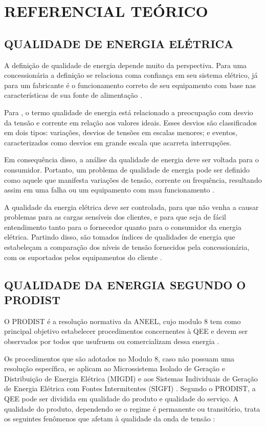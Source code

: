 \chapter{REFERENCIAL TEÓRICO}

\section{QUALIDADE DE ENERGIA ELÉTRICA}

A definição de qualidade de energia depende muito da perspectiva. Para uma concessionária a definição se relaciona coma confiança em seu sistema elétrico, já para um fabricante é o funcionamento correto de seu equipamento com base nas características de sua fonte de alimentação \cite{ref:dugan_2004}.

Para , o termo qualidade de energia está relacionado a preocupação com desvio da tensão e corrente em relação aos valores ideais. Esses desvios são classificados em dois tipos: variações, desvios de tensões em escalas menores; e eventos, caracterizados como desvios em grande escala que acarreta interrupções.

Em consequência disso, a análise da qualidade de energia deve ser voltada para o consumidor. Portanto, um problema de qualidade de energia pode ser definido como aquele que manifesta variações de tensão, corrente ou frequência, resultando assim em uma falha ou um equipamento com mau funcionamento \cite{ref:dugan_2004}.

A qualidade da energia elétrica deve ser controlada, para que não venha a causar problemas para as cargas sensíveis dos clientes, e para que seja de fácil entendimento tanto para o fornecedor quanto para o consumidor da energia elétrica. Partindo disso, são tomados índices de qualidades de energia que estabeleçam a comparação dos níveis de tensão fornecidos pela concessionária, com os suportados pelos equipamentos do cliente \cite{ref:dugan_2004}.

\section{QUALIDADE DA ENERGIA SEGUNDO O PRODIST}

O PRODIST é a resolução normativa da ANEEL, cujo modulo 8 tem como principal objetivo estabelecer procedimentos concernentes à QEE e devem ser observados por todos que usufruem ou comercializam dessa energia \cite{ref:ANEEL2021}.

Os procedimentos que são adotados no Modulo 8, caso não possuam uma resolução específica, se aplicam ao Microssistema Isolado de Geração e Distribuição de Energia Elétrica (MIGDI) e aos Sistemas Individuais de Geração de Energia Elétrica com Fontes Intermitentes (SIGFI) \cite{ref:ANEEL2021}. Segundo o PRODIST, a QEE pode ser dividida em qualidade do produto e qualidade do serviço. A qualidade do produto, dependendo se o regime é permanente ou transitório, trata os seguintes fenômenos que afetam à qualidade da onda de tensão \cite{ref:ANEEL2021}:

